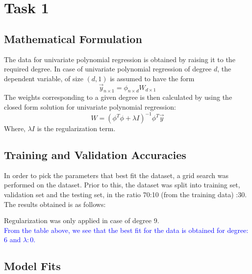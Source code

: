 \documentclass[12pt,a4paper]{article}
\newcommand{\noi}{\noindent}
\begin{document}
\section{Task 1}
\subsection{Mathematical Formulation}
The data for univariate polynomial regression is obtained by raising it to the required degree. In case of univariate polynomial regression of degree $d$, the dependent variable, of size $(d,1)$ is assumed to have the form
\begin{equation}
    \vec{y}_{n\times1} = \mathit{\phi}_{n\times d}W_{d\times1}
\end{equation}
\noi
The weights corresponding to a given degree is then calculated by using the closed form solution for univariate polynomial regression:
\begin{equation}
    W = (\mathit{\phi}^T\mathit{\phi} + \lambda \mathit{I})^{-1}\mathit{\phi}^T\vec{y}
\end{equation}
Where, $\lambda\mathit{I}$ is the regularization term.

\subsection{Training and Validation Accuracies}
In order to pick the parameters that best fit the dataset, a grid search was performed on the dataset. Prior to this, the dataset was split into training set, validation set and the testing set, in the ratio 70:10 (from the training data) :30. The results obtained is as follows:\\

\begin{minipage}{0.4\textwidth}

\end{minipage}\hfill%
\begin{minipage}{0.4\textwidth}

\end{minipage}%

\vspace{1em}
\noi
Regularization was only applied in case of degree 9.\\

\noi
\textcolor{blue}{From the table above, we see that the best fit for the data is obtained for degree: $6$ and $\lambda:0$.}

\subsection{Model Fits}
\end{document}

